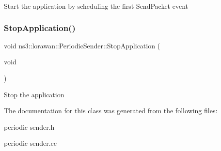 Start the application by scheduling the first Send\+Packet event \mbox{\label{classns3_1_1lorawan_1_1PeriodicSender_aa71c1ba4b856a32bf14cc5e39a383ed1}} 
\subsubsection{\texorpdfstring{Stop\+Application()}{StopApplication()}}
{\footnotesize\ttfamily void ns3\+::lorawan\+::\+Periodic\+Sender\+::\+Stop\+Application (\begin{DoxyParamCaption}\item[{void}]{ }\end{DoxyParamCaption})}

Stop the application 

The documentation for this class was generated from the following files\+:\begin{DoxyCompactItemize}
\item 
periodic-\/sender.\+h\item 
periodic-\/sender.\+cc\end{DoxyCompactItemize}
